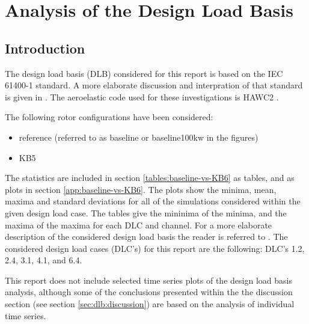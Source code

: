 \chapter{Analysis of the Design Load Basis}

\section{Introduction}

The design load basis (DLB) considered for this report is based on the IEC 61400-1 standard. A more elaborate discussion and interpration of that standard is given in \cite{hansen_design_2015}. The aeroelastic code used for these investigations is HAWC2 \cite{hawc2_manual}.

The following rotor configurations have been considered:
\begin{itemize}
	\item reference (referred to as baseline or baseline100kw in the figures)
	\item KB5
\end{itemize}

The statistics are included in section \ref{tables:baseline-vs-KB6} as tables, and as plots in section \ref{app:baseline-vs-KB6}. The plots show the minima, mean, maxima and standard deviations for all of the simulations considered within the given design load case. The tables give the mininima of the minima, and the maxima of the maxima for each DLC and channel. For a more elaborate description of the considered design load basis the reader is referred to \cite{hansen_design_2015}. The considered design load cases (DLC's) for this report are the following: DLC's 1.2, 2.4, 3.1, 4.1, and 6.4.

This report does not include selected time series plots of the design load basis analysis, although some of the conclusions presented within the the discussion section (see section \ref{sec:dlb:discussion}) are based on the analysis of individual time series.

